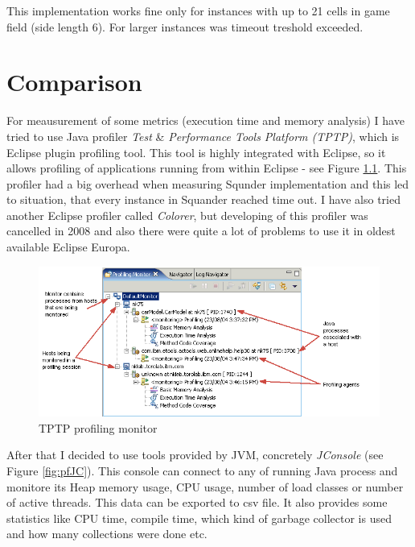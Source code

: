 \documentclass[11pt,twoside,a4paper]{book}
\begin{document}
This implementation works fine only for instances with up to 21 cells in game
field (side length 6). For larger instances was timeout treshold exceeded.
\newpage



\chapter{Comparison}
\label{ch:comparison}
For meausurement of some metrics (execution time and memory analysis) I have
tried to use Java profiler \textit{Test} \& \textit{Performance Tools Platform
(TPTP)}, which is Eclipse plugin profiling tool. This tool is highly integrated with Eclipse, so
it allows profiling of applications running from within Eclipse - see Figure
\ref{fig:pfMonitor}. This profiler had a big overhead when measuring Squnder
implementation and this led to situation, that every instance in Squander
reached time out. I have also tried another Eclipse profiler called
\textit{Colorer}, but developing of this profiler was cancelled in 2008 and also
there were quite a lot of problems to use it in oldest available Eclipse Europa.


\begin{figure}[ht]
\begin{center}
\includegraphics[width=14cm]{figures/pf}
\caption{TPTP profiling monitor}
\label{fig:pfMonitor}
\end{center}
\end{figure}

After that I decided to use tools provided by JVM, concretely \textit{JConsole}
(see Figure \ref{fig:pfJC}). This console can connect to any of running Java
process and monitore its Heap memory usage, CPU usage, number of load classes or
number of active threads. This data can be exported to csv file. It also
provides some statistics like CPU time, compile time, which kind of garbage
collector is used and how many collections were done etc.
\end{document}
